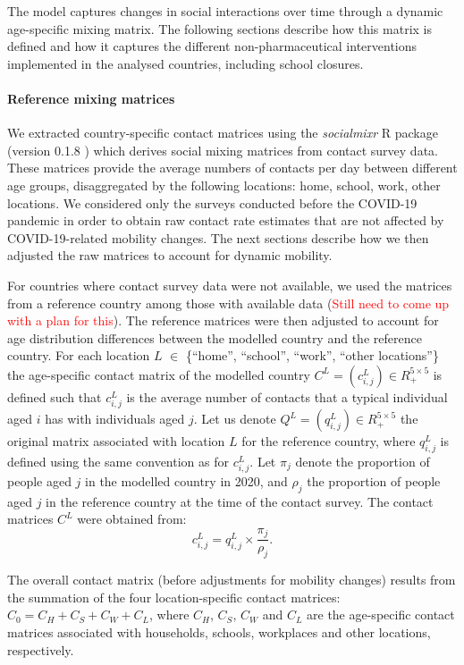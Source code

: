 The model captures changes in social interactions over time through a dynamic age-specific mixing matrix. The following
sections describe how this matrix is defined and how it captures the different non-pharmaceutical interventions implemented
in the analysed countries, including school closures.

\paragraph{Reference mixing matrices}
We extracted country-specific contact matrices using the \textit{socialmixr} R package (version 0.1.8 ) which derives social mixing matrices from 
contact survey data. These matrices provide the average numbers of contacts per day between different age groups, disaggregated by the following 
locations: home, school, work, other locations. We considered only the surveys conducted before the COVID-19 pandemic in order to obtain 
raw contact rate estimates that are not affected by COVID-19-related mobility changes. The next sections describe how we then adjusted 
the raw matrices to account for dynamic mobility.

For countries where contact survey data were not available, we used the matrices from a reference country among 
those with available data (\textcolor{red}{Still need to come up with a plan for this}). The reference matrices were 
then adjusted to account for age distribution differences between the modelled country and the reference country. For each 
location $L$ $\in$ \{``home'', ``school'', ``work'', ``other locations''\} the age-specific contact matrix of the modelled country $C^L = (c_{i,j}^L) \in R_{+}^{5 \times 5}$ 
is defined such that $c_{i,j}^L$ is the average number of contacts that a typical individual aged $i$ has with individuals aged $j$. 
Let us denote $Q^L = (q_{i,j}^L) \in R_{+}^{5 \times 5}$ the original matrix associated with location $L$ for the reference country, where $q_{i,j}^L$ is defined using the same 
convention as for $c_{i,j}^L$. Let $\pi_j$ denote the proportion of people aged $j$ in the modelled country in 2020, and $\rho_j$ the proportion of people aged $j$ in the reference country 
at the time of the contact survey. 
The contact matrices $C^L$ were obtained from:
$$
c_{i,j}^L = q_{i,j}^L \times \frac{\pi_j}{\rho_j} . 
$$

The overall contact matrix (before adjustments for mobility changes) results from the summation of the four location-specific 
contact matrices: \(C_{0}=C_{H}+C_{S}+C_{W}+C_{L}\), where \(C_{H}\), \(C_{S}\), \(C_{W}\) and \(C_{L}\) are the age-specific
contact matrices associated with households, schools, workplaces and other locations, respectively.

